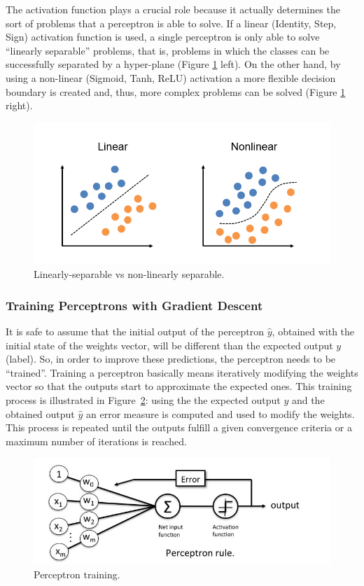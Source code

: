 The activation function plays a crucial role because it actually determines the
sort of problems that a perceptron is able to solve. If a linear (Identity,
Step, Sign) activation function is used, a single perceptron is only able to
solve ``linearly separable'' problems, that is, problems in which the classes
can be successfully separated by a hyper-plane (Figure
\ref{fig:linear_vs_non_linear} left). On the other hand, by using a non-linear
(Sigmoid, Tanh, ReLU) activation a more flexible decision boundary is created
and, thus, more complex problems can be solved (Figure
\ref{fig:linear_vs_non_linear} right).

\begin{figure}[!htbp]
    \centering
    \includegraphics[width=.5\textwidth]{Images/linear_vs_non_linear.png}
    \caption{Linearly-separable vs non-linearly separable.}
    \label{fig:linear_vs_non_linear}
\end{figure}

\subsubsection{Training Perceptrons with Gradient Descent}
 
It is safe to assume that the initial output of the perceptron $\hat{y}$,
obtained with the initial state of the weights vector, will be different than
the expected output $y$ (label). So, in order to improve these predictions, the
perceptron needs to be ``trained''. Training a perceptron basically means
iteratively modifying the weights vector so that the outputs start to
approximate the expected ones. This training process is illustrated in
Figure~\ref{fig:perceptron_train}: using the the expected output $y$ and the
obtained output $\hat{y}$ an error measure is computed and used to modify the
weights. This process is repeated until the outputs fulfill a  given convergence
criteria or a maximum number of iterations is reached.
 
\begin{figure}[!htbp]
    \centering
    \includegraphics[width=.5\textwidth]{Images/perceptron_learning.jpg}
    \caption{Perceptron training.}
    \label{fig:perceptron_train}
\end{figure}

